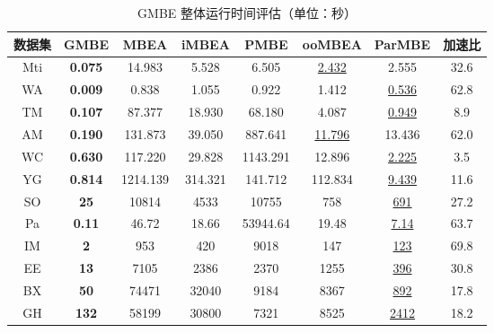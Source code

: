 \begin{table} [t]
	\centering    
	\setlength{\abovecaptionskip}{0cm}  
  \setlength{\belowcaptionskip}{-0.1cm}
	\caption{GMBE 整体运行时间评估（单位：秒）}      
	\label{tbl:gmbe_time}
	\setlength{\tabcolsep}{5pt}
	\begin{center}
				\normalsize{
		\begin{tabular}{cccccccc}
			\hline 

      \textbf{数据集} & \textbf{GMBE} & \textbf{MBEA} & \textbf{iMBEA} & \textbf{PMBE} & \textbf{ooMBEA} & \textbf{ParMBE} & \textbf{加速比} \\ \hline
      Mti & \textbf{0.075} & 14.983 & 5.528 & 6.505 & \uline{2.432} & 2.555 & 32.6 \\
      WA & \textbf{0.009} & 0.838 & 1.055 & 0.922 & 1.412 & \uline{0.536} & 62.8 \\
      TM & \textbf{0.107} & 87.377 & 18.930 & 68.180 & 4.087 & \uline{0.949} & 8.9 \\
      AM & \textbf{0.190} & 131.873 & 39.050 & 887.641 & \uline{11.796} & 13.436 & 62.0 \\
      WC & \textbf{0.630} & 117.220 & 29.828 & 1143.291 & 12.896 & \uline{2.225} & 3.5 \\
      YG & \textbf{0.814} & 1214.139 & 314.321 & 141.712 & 112.834 & \uline{9.439} & 11.6 \\
      SO & \textbf{25} & 10814 & 4533 & 10755 & 758 & \uline{691} & 27.2 \\
      Pa & \textbf{0.11} & 46.72 & 18.66 & 53944.64 & 19.48 & \uline{7.14} & 63.7 \\
      IM & \textbf{2} & 953 & 420 & 9018 & 147 & \uline{123} & 69.8 \\
      EE & \textbf{13} & 7105 & 2386 & 2370 & 1255 & \uline{396} & 30.8 \\
      BX & \textbf{50} & 74471 & 32040 & 9184 & 8367 & \uline{892} & 17.8 \\
      GH & \textbf{132} & 58199 & 30800 & 7321 & 8525 & \uline{2412} & 18.2 \\
      \hline
      
		\end{tabular}
				}
	\end{center}

\end{table}
